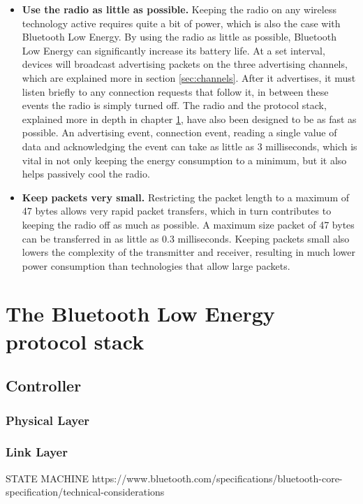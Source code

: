 \documentclass[pdftex,a4paper,12pt,twoside]{report}
\begin{document}
\begin{itemize}
\item{\textbf{Use the radio as little as possible.} Keeping the radio on any wireless technology active requires quite a bit of power, which is also the case with Bluetooth Low Energy. By using the radio as little as possible, Bluetooth Low Energy can significantly increase its battery life. At a set interval, devices will broadcast advertising packets on the three advertising channels, which are explained more in section \ref{sec:channels}. After it advertises, it must listen briefly to any connection requests that follow it, in between these events the radio is simply turned off. The radio and the protocol stack, explained more in depth in chapter \ref{ch:protocolstack}, have also been designed to be as fast as possible. An advertising event, connection event, reading a single value of data and acknowledging the event can take as little as 3 milliseconds, which is vital in not only keeping the energy consumption to a minimum, but it also helps passively cool the radio.}

\item{\textbf{Keep packets very small.} Restricting the packet length to a maximum of 47 bytes allows very rapid packet transfers, which in turn contributes to keeping the radio off as much as possible. A maximum size packet of 47 bytes can be transferred in as little as 0.3 milliseconds. Keeping packets small also lowers the complexity of the transmitter and receiver, resulting in much lower power consumption than technologies that allow large packets.}
\end{itemize}

\chapter{The Bluetooth Low Energy protocol stack}
\label{ch:protocolstack}

\section{Controller}
\label{sec:stackController}

\subsection{Physical Layer}
\label{subsec:controllerPHY}

\subsection{Link Layer}
\label{subsec:controllerLL}
STATE MACHINE https://www.bluetooth.com/specifications/bluetooth-core-specification/technical-considerations
\end{document}
